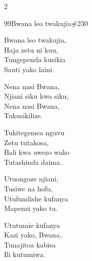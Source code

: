 \documentclass{article}
\begin{document}
\begin{multicols}{2}
\begin{hymn}{99}{Bwana leo twakujia}{\#230}
\begin{stanza}
Bwana leo twakujia,\\
Haja zetu ni kuu,\\
Tungependa kusikia\\
Sauti yako laini.
\end{stanza}
\begin{chorus}
Nena nasi Bwana,\\
Njiani siku kwa siku,\\
Nena nasi Bwana,\\
Tukusikilize.
\end{chorus}
\begin{stanza}
Tukitegemea nguvu\\
Zetu tutakosa,\\
Bali kwa uwezo wako\\
Tutashinda daima.
\end{stanza}
\begin{stanza}
Utuongoze njiani,\\
Tusiwe na hofu,\\
Utufundishe kufanya\\
Mapenzi yako tu.
\end{stanza}
\begin{stanza}
Ututumie kufanya\\
Kazi yako, Bwana,\\
Tunajitoa kabisa\\
Ili kutumiwa.
\end{stanza}
\end{hymn}


\end{multicols}
\end{document}
